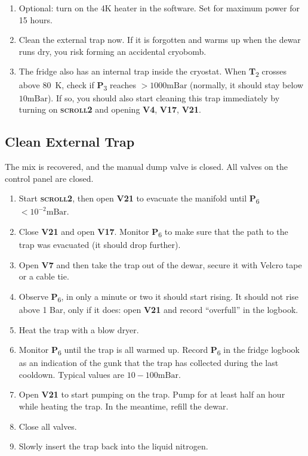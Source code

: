\documentclass{article}[18pt,A4]
\newcommand{\mBar}{\mathrm{mBar}}
\newcommand{\thing}[1]{{\color{gray}\textsc{ \textbf{#1}}}}
\newcommand{\valve}[1]{{\color{gray}\textbf{V#1}}}
\newcommand{\pressure}[1]{{\color{pressurecolor}\textbf{P}\textsubscript{#1}}}
\newcommand{\temperature}[1]{{\color{temperaturecolor}\textbf{T}\textsubscript{#1}}}
\begin{document}
\begin{enumerate}
    \item Optional: turn on the 4K heater in the software. Set for maximum power for 15 hours.
    \item Clean the external trap now. If it is forgotten and warms up when the dewar runs dry, you risk forming an accidental cryobomb. 
    \item The fridge also has an internal trap inside the cryostat.
    When \temperature{2} crosses above $80$~K,  check if \pressure{3} reaches $> 1000 \mBar$
     (normally, it should stay below $10 \mBar$).
     If so, you should also start cleaning this trap immediately by turning on \thing{scroll2} and opening \valve{4}, \valve{17}, \valve{21}. 
\end{enumerate}

\subsection{Clean External Trap}
The mix is recovered, and the manual dump valve is closed. All valves on the control panel are closed. 
\begin{enumerate}
    \item Start \thing{scroll2}, then open \valve{21} to  evacuate the manifold until
    \pressure{6} $< 10^{-2} \mBar$. 
    \item Close \valve{21} and open \valve{17}. Monitor \pressure{6}
    to make sure that the path to the trap was evacuated (it should drop further). 
    \item Open \valve{7} and then take the trap out of the dewar,
    secure it with Velcro tape or a cable tie.
    \item Observe \pressure{6}, in only a minute or two it should start rising. It should not rise above 1 Bar, only if it does: open \valve{21} and record ``overfull'' in the logbook.
    \item Heat the trap with a blow dryer.
    \item Monitor \pressure{6} until the trap is all warmed up. Record \pressure{6}
     in the fridge logbook as an indication of the gunk that the trap has collected during the last cooldown. Typical values are $10-100\mBar$.
    \item Open \valve{21} to start pumping on the trap.
    Pump for at least half an hour while heating the trap. In the meantime, refill the dewar.
    \item Close all valves.
    \item Slowly insert the trap back into the liquid nitrogen.
\end{enumerate}
\end{document}
